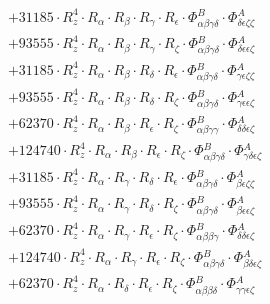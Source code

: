\documentclass{article}
\begin{document}
\begin{subequations}
\begin{gather}
\begin{array}{c}
 \\[0.2em] 		 + 31185 \cdot R_{z}^{4} \cdot R_{\alpha{}} \cdot R_{\beta{}} \cdot R_{\gamma{}} \cdot R_{\epsilon{}} \cdot \Phi{}^{B}_{\alpha{}\beta{}\gamma{}\delta{}} \cdot \Phi{}^{A}_{\delta{}\epsilon{}\zeta{}\zeta{}} 
 \\[0.2em] 		 + 93555 \cdot R_{z}^{4} \cdot R_{\alpha{}} \cdot R_{\beta{}} \cdot R_{\gamma{}} \cdot R_{\zeta{}} \cdot \Phi{}^{B}_{\alpha{}\beta{}\gamma{}\delta{}} \cdot \Phi{}^{A}_{\delta{}\epsilon{}\epsilon{}\zeta{}} 
 \\[0.2em] 		 + 31185 \cdot R_{z}^{4} \cdot R_{\alpha{}} \cdot R_{\beta{}} \cdot R_{\delta{}} \cdot R_{\epsilon{}} \cdot \Phi{}^{B}_{\alpha{}\beta{}\gamma{}\delta{}} \cdot \Phi{}^{A}_{\gamma{}\epsilon{}\zeta{}\zeta{}} 
 \\[0.2em] 		 + 93555 \cdot R_{z}^{4} \cdot R_{\alpha{}} \cdot R_{\beta{}} \cdot R_{\delta{}} \cdot R_{\zeta{}} \cdot \Phi{}^{B}_{\alpha{}\beta{}\gamma{}\delta{}} \cdot \Phi{}^{A}_{\gamma{}\epsilon{}\epsilon{}\zeta{}} 
 \\[0.2em] 		 + 62370 \cdot R_{z}^{4} \cdot R_{\alpha{}} \cdot R_{\beta{}} \cdot R_{\epsilon{}} \cdot R_{\zeta{}} \cdot \Phi{}^{B}_{\alpha{}\beta{}\gamma{}\gamma{}} \cdot \Phi{}^{A}_{\delta{}\delta{}\epsilon{}\zeta{}} 
 \\[0.2em] 		 + 124740 \cdot R_{z}^{4} \cdot R_{\alpha{}} \cdot R_{\beta{}} \cdot R_{\epsilon{}} \cdot R_{\zeta{}} \cdot \Phi{}^{B}_{\alpha{}\beta{}\gamma{}\delta{}} \cdot \Phi{}^{A}_{\gamma{}\delta{}\epsilon{}\zeta{}} 
 \\[0.2em] 		 + 31185 \cdot R_{z}^{4} \cdot R_{\alpha{}} \cdot R_{\gamma{}} \cdot R_{\delta{}} \cdot R_{\epsilon{}} \cdot \Phi{}^{B}_{\alpha{}\beta{}\gamma{}\delta{}} \cdot \Phi{}^{A}_{\beta{}\epsilon{}\zeta{}\zeta{}} 
 \\[0.2em] 		 + 93555 \cdot R_{z}^{4} \cdot R_{\alpha{}} \cdot R_{\gamma{}} \cdot R_{\delta{}} \cdot R_{\zeta{}} \cdot \Phi{}^{B}_{\alpha{}\beta{}\gamma{}\delta{}} \cdot \Phi{}^{A}_{\beta{}\epsilon{}\epsilon{}\zeta{}} 
 \\[0.2em] 		 + 62370 \cdot R_{z}^{4} \cdot R_{\alpha{}} \cdot R_{\gamma{}} \cdot R_{\epsilon{}} \cdot R_{\zeta{}} \cdot \Phi{}^{B}_{\alpha{}\beta{}\beta{}\gamma{}} \cdot \Phi{}^{A}_{\delta{}\delta{}\epsilon{}\zeta{}} 
 \\[0.2em] 		 + 124740 \cdot R_{z}^{4} \cdot R_{\alpha{}} \cdot R_{\gamma{}} \cdot R_{\epsilon{}} \cdot R_{\zeta{}} \cdot \Phi{}^{B}_{\alpha{}\beta{}\gamma{}\delta{}} \cdot \Phi{}^{A}_{\beta{}\delta{}\epsilon{}\zeta{}} 
 \\[0.2em] 		 + 62370 \cdot R_{z}^{4} \cdot R_{\alpha{}} \cdot R_{\delta{}} \cdot R_{\epsilon{}} \cdot R_{\zeta{}} \cdot \Phi{}^{B}_{\alpha{}\beta{}\beta{}\delta{}} \cdot \Phi{}^{A}_{\gamma{}\gamma{}\epsilon{}\zeta{}} 

\end{array}
\end{gather}
\end{subequations}
\end{document}
